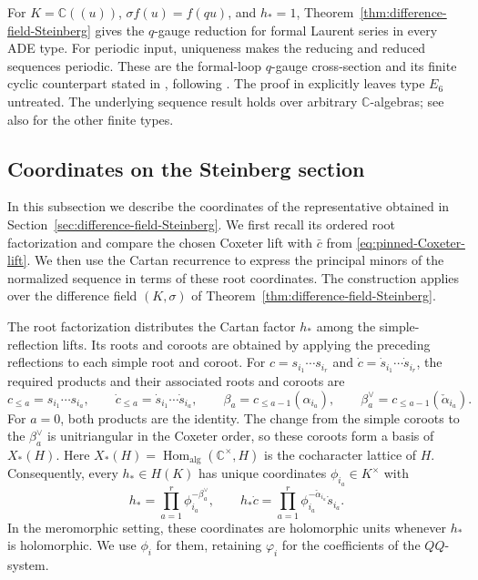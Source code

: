 \documentclass[11pt,leqno]{amsart}
\numberwithin{equation}{section}
\theoremstyle{plain}
\theoremstyle{definition}
\theoremstyle{plain}
\theoremstyle{definition}
\theoremstyle{remark}
\begin{document}
For $K=\mathbb C((u))$, $\sigma f(u)=f(qu)$, and $h_*=1$, Theorem~\ref{thm:difference-field-Steinberg} gives the $q$-gauge reduction for formal Laurent series in every ADE type.  For periodic input, uniqueness makes the reducing and reduced sequences periodic.  These are the formal-loop $q$-gauge cross-section and its finite cyclic counterpart stated in \cite[Theorems~1.1 and~2.9]{SS1998}, following \cite{FrenkelReshetikhinSTS1998}.  The proof in \cite[\S3, footnote~2]{SS1998} explicitly leaves type $E_6$ untreated.  The underlying sequence result holds over arbitrary $\mathbb C$-algebras; see also \cite[Remark~41]{FL2025} for the other finite types.

\subsection{Coordinates on the Steinberg section}\label{sec:Miura-Steinberg}
In this subsection we describe the coordinates of the representative obtained in Section~\ref{sec:difference-field-Steinberg}.  We first recall its ordered root factorization and compare the chosen Coxeter lift with $\bar c$ from \eqref{eq:pinned-Coxeter-lift}.  We then use the Cartan recurrence to express the principal minors of the normalized sequence in terms of these root coordinates.  The construction applies over the difference field $(K,\sigma)$ of Theorem~\ref{thm:difference-field-Steinberg}.

The root factorization distributes the Cartan factor $h_*$ among the simple-reflection lifts. Its roots and coroots are obtained by applying the preceding reflections to each simple root and coroot. For $c=s_{i_1}\cdots s_{i_r}$ and $\dot c=\dot s_{i_1}\cdots\dot s_{i_r}$, the required products and their associated roots and coroots are
\[
 c_{\le a}=s_{i_1}\cdots s_{i_a},\qquad
 \dot c_{\le a}=\dot s_{i_1}\cdots\dot s_{i_a},\qquad
 \beta_a=c_{\le a-1}(\alpha_{i_a}),\qquad
 \beta_a^\vee=c_{\le a-1}(\check\alpha_{i_a}).
\]
For $a=0$, both products are the identity.  The change from the simple coroots to the $\beta_a^\vee$ is unitriangular in the Coxeter order, so these coroots form a basis of $X_*(H)$. Here $X_*(H)=\operatorname{Hom}_{\mathrm{alg}}(\mathbb C^\times,H)$ is the cocharacter lattice of $H$. Consequently, every $h_*\in H(K)$ has unique coordinates $\phi_{i_a}\in K^\times$ with
\begin{equation}\label{eq:weighted-Coxeter-lift}
 h_* =\prod_{a=1}^r\phi_{i_a}^{-\beta_a^\vee},
 \qquad
 h_*\dot c=\prod_{a=1}^r
       \phi_{i_a}^{-\check\alpha_{i_a}}\dot s_{i_a}.
\end{equation}
In the meromorphic setting, these coordinates are holomorphic units whenever $h_*$ is holomorphic.  We use $\phi_i$ for them, retaining $\varphi_i$ for the coefficients of the $QQ$-system.
\end{document}
